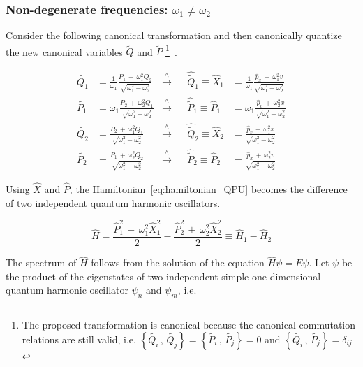 \subsubsection{Non-degenerate frequencies: $\omega_1 \neq \omega_2$}

Consider the following canonical transformation and then canonically quantize
the new canonical variables $\tilde{Q}$ and $\tilde{P}$
\footnote{
  The proposed transformation is canonical because the canonical commutation
  relations are still valid, i.e.
  $\left\{ \tilde{Q_i} \, , \, \tilde{Q_j}\right\} =
  \left\{ \tilde{P_i} \, , \, \tilde{P_j}\right\} = 0$ and
  $\left\{ \tilde{Q_i} \, , \, \tilde{P_j}\right\} = \delta_{ij}$
}~\cite{Mannheim05}.

\begin{align*}
  \tilde{Q_1} &= \frac{1}{\omega_1}
    \frac{P_1 \, + \,  \omega_1^2 Q_2} {\sqrt{\omega_1^2-\omega_2^2}}
              &\xrightarrow{\wedge}& &\hat{\tilde{Q}}_1 \equiv
  \hat{X}_1 &= \frac{1}{\omega_1}
    \frac{\hat{p}_x \, + \,  \omega_1^2 v} {\sqrt{\omega_1^2-\omega_2^2}}
    \\
  \tilde{P_1} &= \omega_1
    \frac{P_2 \, + \, \omega_2^2 Q_1} {\sqrt{\omega_1^2-\omega_2^2}}
              &\xrightarrow{\wedge}& &\hat{\tilde{P}}_1 \equiv
    \hat{P}_1 &= \omega_1
    \frac{\hat{p}_v \, + \,  \omega_2^2 x} {\sqrt{\omega_1^2-\omega_2^2}}
    \\
  \tilde{Q_2} &=
    \frac{P_2 \, + \,  \omega_1^2 Q_1} {\sqrt{\omega_1^2-\omega_2^2}}
              &\xrightarrow{\wedge}& &\hat{\tilde{Q}}_2 \equiv
  \hat{X}_2 &=
    \frac{\hat{p}_v \, + \,  \omega_1^2 x} {\sqrt{\omega_1^2-\omega_2^2}}
    \\
  \tilde{P_2} &=
    \frac{P_1 \, + \, \omega_2^2 Q_2} {\sqrt{\omega_1^2-\omega_2^2}}
              &\xrightarrow{\wedge}& &\hat{\tilde{P}}_2 \equiv
  \hat{P}_2 &=
    \frac{\hat{p}_x \, + \,  \omega_2^2 v} {\sqrt{\omega_1^2-\omega_2^2}}
\end{align*}

Using $\hat{X}$ and $\hat{P}$, the Hamiltonian~\eqref{eq:hamiltonian_QPU}
becomes the difference of two independent quantum harmonic oscillators.

\begin{equation} \label{eq:Ham-QPU-HO}
  \hat{H} =
  \frac{\hat{P}_1^2 \, + \, \omega_1^2 \hat{X}_1^2}{2} -
  \frac{\hat{P}_2^2 \, + \, \omega_2^2 \hat{X}_2^2}{2} \equiv
  \hat{H}_1 - \hat{H}_2
\end{equation}

The spectrum of $\hat{H}$ follows from the solution of the equation
$\hat{H} \psi = E \psi$. Let $\psi$ be the product of the eigenstates of two
independent simple one-dimensional quantum harmonic oscillator $\psi_n$ and
$\psi_m$, i.e.

